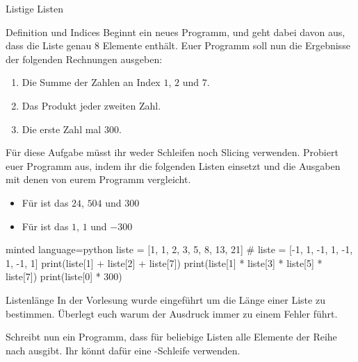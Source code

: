 \begin{task}[points=auto]{Listige Listen}
    \begin{subtask*}[points=0]{Definition und Indices }
        Beginnt ein neues Programm, und geht dabei davon aus, dass die Liste
         genau $8$ Elemente enthält. Euer Programm soll
        nun die Ergebnisse der folgenden Rechnungen ausgeben:

        \begin{enumerate}
            \item Die Summe der Zahlen an Index $1$, $2$ und $7$.
            \item Das Produkt jeder zweiten Zahl.
            \item Die erste Zahl mal 300.
        \end{enumerate}

        Für diese Aufgabe müsst ihr weder Schleifen noch Slicing verwenden. Probiert
        euer Programm aus, indem ihr die folgenden Listen einsetzt und die Ausgaben
        mit denen von eurem Programm vergleicht.

        \begin{itemize}
            \item Für  ist das $24$, $504$ und $300$
            \item Für  ist das $1$, $1$ und $-300$
        \end{itemize}

        \begin{solution}
            \begin{codeBlock}[]{minted language=python}
                liste = [1, 1, 2, 3, 5, 8, 13, 21]
                # liste = [-1, 1, -1, 1, -1, 1, -1, 1]
                print(liste[1] + liste[2] + liste[7])
                print(liste[1] * liste[3] * liste[5] * liste[7])
                print(liste[0] * 300)
            \end{codeBlock}
        \end{solution}
    \end{subtask*}
    \begin{subtask*}[points=0]{Listenlänge }
        In der Vorlesung wurde  eingeführt um die Länge einer
        Liste zu bestimmen. Überlegt euch warum der Ausdruck 
        immer zu einem Fehler führt.

        Schreibt nun ein Programm, dass für beliebige Listen alle Elemente der Reihe
        nach ausgibt. Ihr könnt dafür eine -Schleife verwenden.


\end{subtask*}
\end{task}
